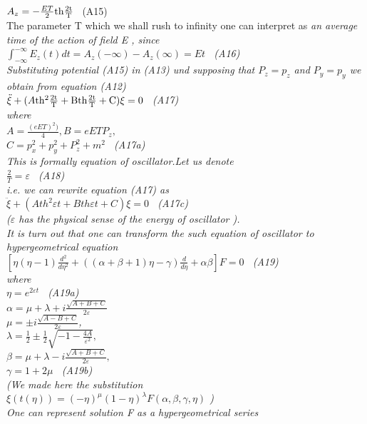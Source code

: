 \documentclass[a4paper,12pt] {article}
\begin{document}
\\ $ A_z =-\frac {ET}{2}\rm th \frac {2t}{T} $ \ (A15) \\ The parameter T which we
shall rush to infinity one can interpret as \it  an average time of the action of  field \rm  E , since
 \\$ \int _{-\infty} ^ {-\infty}{ E_z (t)dt} =A_z(-\infty)-A_z (\infty) =Et $ \ (A16)\\ Substituting potential
 (A15) in  (A13) und supposing that $P_z= p_z $ and $ P_y=p_y $ we obtain from equation (A12)\\
 $\ddot \xi +(A \rm th^2 \frac {2t}{T}+B \rm th \frac {2t}{T}+C)\xi =0 $ \ (A17) \\ where
\\ $ A=\frac {(eET)^2)}{4}, B=eETP_z, $\\$ C=p_x^2+p_y^2 +P_z^2 +m^2 $ \ (A17a) \\ This is formally
 equation of oscillator.Let us denote \\$\frac{2}{T} = \varepsilon $ \ (A18)\\i.e. we can rewrite
 equation (A17) as\\ $\ddot \xi +(A th^2  {\varepsilon t}+B th {\varepsilon t}+C)\xi =0 $ \ (A17c)\\
 ($\varepsilon$ has the physical sense \it  of  the energy of oscillator \rm).
\\  It is turn out \it  that one can transform  the such equation of oscillator to  hypergeometrical  equation \rm
\\$ [\eta (\eta-1)\frac {d^2}{d\eta ^2} +((\alpha +\beta +1) \eta-\gamma)\frac {d}{d\eta}+\alpha \beta ]F =0 $ \ (A19) \\where
\\ $\eta=e ^{2\varepsilon t} $ \ (A19a)\\$\alpha =\mu +\lambda +i\frac {\sqrt {A+B+C}}{2\varepsilon} $
\\$ \mu = \pm i\frac {\sqrt {A-B+C}}{2\varepsilon} $,
\\ $ \lambda =\frac {1}{2}\pm \frac {1}{2}\sqrt {-1-\frac {4A}{\varepsilon^2}},
$ \\$\beta = \mu +\lambda -i\frac {\sqrt {A+B+C}}{2\varepsilon}, $ \\$ \gamma =1+2\mu  $ \ (A19b)
\\ (We made here the substitution \\$\xi (t( \eta)) = (-\eta)^{\mu}(1- \eta)^{\lambda}F(\alpha, \beta,\gamma,\eta) $ )
\\ One can represent  solution F as a \it hypergeometrical series\rm
\end{document}
